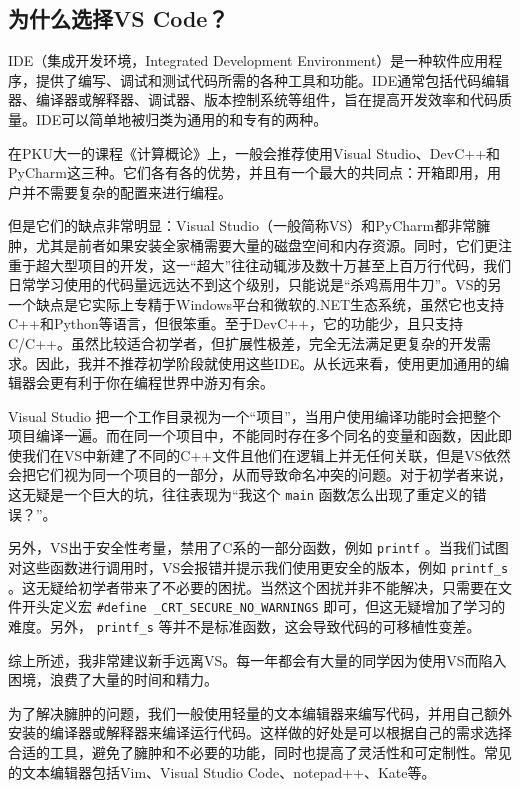 \subsection{为什么选择VS Code？}

IDE（集成开发环境，Integrated Development Environment）是一种软件应用程序，提供了编写、调试和测试代码所需的各种工具和功能。IDE通常包括代码编辑器、编译器或解释器、调试器、版本控制系统等组件，旨在提高开发效率和代码质量。IDE可以简单地被归类为通用的和专有的两种。

在PKU大一的课程《计算概论》上，一般会推荐使用Visual Studio、DevC++和PyCharm这三种。它们各有各的优势，并且有一个最大的共同点：开箱即用，用户并不需要复杂的配置来进行编程。

但是它们的缺点非常明显：Visual Studio（一般简称VS）和PyCharm都非常臃肿，尤其是前者如果安装全家桶需要大量的磁盘空间和内存资源。同时，它们更注重于超大型项目的开发，这一“超大”往往动辄涉及数十万甚至上百万行代码，我们日常学习使用的代码量远远达不到这个级别，只能说是“杀鸡焉用牛刀”。VS的另一个缺点是它实际上专精于Windows平台和微软的.NET生态系统，虽然它也支持C++和Python等语言，但很笨重。至于DevC++，它的功能少，且只支持C/C++。虽然比较适合初学者，但扩展性极差，完全无法满足更复杂的开发需求。因此，我并不推荐初学阶段就使用这些IDE。从长远来看，使用更加通用的编辑器会更有利于你在编程世界中游刃有余。

\begin{note}
  Visual Studio 把一个工作目录视为一个“项目”，当用户使用编译功能时会把整个项目编译一遍。而在同一个项目中，不能同时存在多个同名的变量和函数，因此即使我们在VS中新建了不同的C++文件且他们在逻辑上并无任何关联，但是VS依然会把它们视为同一个项目的一部分，从而导致命名冲突的问题。对于初学者来说，这无疑是一个巨大的坑，往往表现为“我这个 \verb|main| 函数怎么出现了重定义的错误？”。

  另外，VS出于安全性考量，禁用了C系的一部分函数，例如 \verb|printf| 。当我们试图对这些函数进行调用时，VS会报错并提示我们使用更安全的版本，例如 \verb|printf_s| 。这无疑给初学者带来了不必要的困扰。当然这个困扰并非不能解决，只需要在文件开头定义宏 \verb|#define _CRT_SECURE_NO_WARNINGS| 即可，但这无疑增加了学习的难度。另外， \verb|printf_s| 等并不是标准函数，这会导致代码的可移植性变差。

  综上所述，我非常建议新手远离VS。每一年都会有大量的同学因为使用VS而陷入困境，浪费了大量的时间和精力。
\end{note}

为了解决臃肿的问题，我们一般使用轻量的文本编辑器来编写代码，并用自己额外安装的编译器或解释器来编译运行代码。这样做的好处是可以根据自己的需求选择合适的工具，避免了臃肿和不必要的功能，同时也提高了灵活性和可定制性。常见的文本编辑器包括Vim、Visual Studio Code、notepad++、Kate等。

